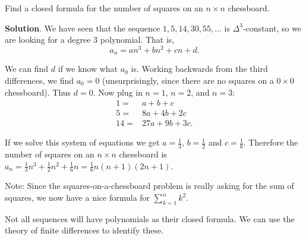 \documentclass[11pt,]{book}
\theoremstyle{ptxplainnotitle}
\theoremstyle{ptxplaintitle}
\theoremstyle{ptxdefinitionnotitle}
\theoremstyle{ptxdefinitiontitle}
\theoremstyle{ptxdefinitionnotitle}
\theoremstyle{ptxdefinitiontitle}
\theoremstyle{ptxdefinitionnotitle}
\theoremstyle{ptxdefinitiontitle}
\theoremstyle{ptxdefinitiontitlenonumber}
\theoremstyle{ptxdefinitiontitlenonumber}
\numberwithin{equation}{chapter}
\renewcommand{\d}{\displaystyle}
\newcommand{\amp}{&}
\begin{document}
\begin{example}\label{example-16}
\hypertarget{p-358}{}%
Find a closed formula for the number of squares on an \(n \times n\) chessboard.%
\par\smallskip%
\noindent\textbf{Solution}.\hypertarget{solution-43}{}\quad%
\hypertarget{p-359}{}%
We have seen that the sequence \(1, 5, 14, 30, 55, \ldots\) is \(\Delta^3\)-constant, so we are looking for a degree 3 polynomial. That is,%
\begin{equation*}
a_n = an^3 + bn^2 + cn + d.
\end{equation*}
%
\par
\hypertarget{p-360}{}%
We can find \(d\) if we know what \(a_0\) is. Working backwards from the third differences, we find \(a_0 = 0\) (unsurprisingly, since there are no squares on a \(0\times 0\) chessboard). Thus \(d = 0\). Now plug in \(n = 1\), \(n =2\), and \(n =3\):%
\begin{align*}
1 = \amp a + b + c\\
5 = \amp 8a + 4b + 2c\\
14 = \amp 27a + 9b + 3c.
\end{align*}
%
\par
\hypertarget{p-361}{}%
If we solve this system of equations we get \(a = \frac{1}{3}\), \(b = \frac{1}{2}\) and \(c = \frac{1}{6}\). Therefore the number of squares on an \(n \times n\) chessboard is \(a_n = \frac{1}{3}n^3 + \frac{1}{2}n^2 + \frac{1}{6}n = \frac{1}{6}n(n+1)(2n+1)\).%
\end{example}
\hypertarget{p-362}{}%
Note: Since the squares-on-a-chessboard problem is really asking for the sum of squares, we now have a nice formula for \(\d\sum_{k=1}^n k^2\).%
\par
\hypertarget{p-363}{}%
Not all sequences will have polynomials as their closed formula. We can use the theory of finite differences to identify these.%
\end{document}
